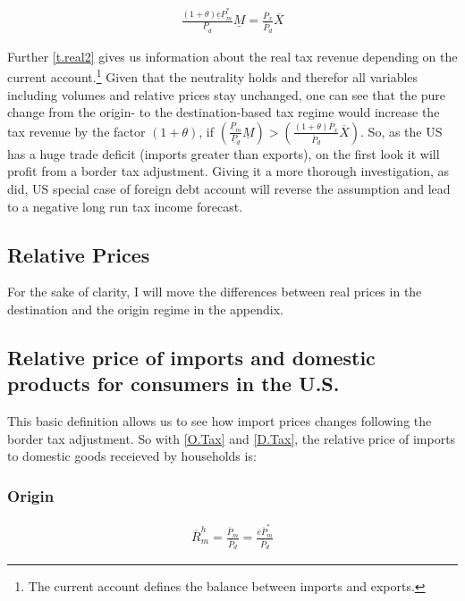 \begin{equation}
    \begin{aligned}
        \frac{(1+\theta)\underline e \underline P_m^*}{\underline P_d}\underline M = \frac{\overline P_x}{\overline P_d} \overline X
    \end{aligned}
\end{equation}


Further \eqref{t.real2} gives us information about the real tax revenue depending on the current account.\footnote{The current account defines the balance between imports and exports. } Given that the neutrality holds and therefor all variables including volumes and relative prices stay unchanged, one can see that the pure change from the origin- to the destination-based tax regime would increase the tax revenue by the factor $(1+\theta)$, if $\left(\frac{\underline P_m}{\underline P_d} \underline M\right) > \left(\frac{ \left( 1+\theta \right) \overline P_x}{\overline P_d}\overline X\right) $. So, as the US has a huge trade deficit (imports greater than exports), on the first look it will profit from a border tax adjustment. Giving it a more thorough investigation, as \cite{Feldstein&Krugman} did, US special case of foreign debt account will reverse the assumption and lead to a negative long run tax income forecast.



\subsection*{Relative Prices}
For the sake of clarity, I will move the differences between real prices in the destination and the origin regime in the appendix. 
\subsection*{Relative price of imports and domestic products for consumers in the U.S.}
This basic definition allows us to see how import prices changes following the border tax adjustment. So with \eqref{O.Tax} and \eqref{D.Tax}, the relative price of imports to domestic goods receieved by households is:
\subsubsection*{Origin}
\begin{equation}\label{mcon.o}
\begin{aligned}
\overline R^h_m = \frac{\overline P_m}{\overline P_d} = \frac{\overline e \overline P^*_m}{\overline P_d}
\end{aligned} 
\end{equation}

